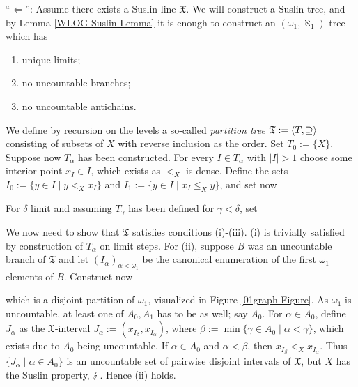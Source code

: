 {``$\Leftarrow$'': Assume there exists a Suslin line $\mathfrak{X}$. We will construct a Suslin tree, and by Lemma \ref{WLOG Suslin Lemma} it is enough to construct an $(\omega_1,\aleph_1)$-tree which has
\begin{enumerate}
\item unique limits;
\item no uncountable branches;
\item no uncountable antichains.\\
\end{enumerate}

We define by recursion on the levels a so-called \textit{partition tree} $\mathfrak{T}:=\langle T,\supseteq\rangle$ consisting of subsets of $X$ with reverse inclusion as the order. Set $T_0:=\{X\}$. Suppose now $T_\alpha$ has been constructed. For every $I\in T_\alpha$ with $|I|>1$ choose some interior point $x_I\in I$, which exists as $<_X$ is dense. Define the sets $I_0:=\{y\in I\mid y<_X x_I\}$ and $I_1:=\{y\in I\mid x_I\leq_X y\}$, and set now

For $\delta$ limit and assuming $T_\gamma$ has been defined for $\gamma<\delta$, set

We now need to show that $\mathfrak{T}$ satisfies conditions (i)-(iii). (i) is trivially satisfied by construction of $T_\alpha$ on limit steps. For (ii), suppose $B$ was an uncountable branch of $\mathfrak{T}$ and let $(I_\alpha)_{\alpha<\omega_1}$ be the canonical enumeration of the first $\omega_1$ elements of $B$. Construct now

which is a disjoint partition of $\omega_1$, visualized in Figure \ref{01graph Figure}. As $\omega_1$ is uncountable, at least one of $A_0,A_1$ has to be as well; say $A_0$. For $\alpha\in A_0$, define $J_\alpha$ as the $\mathfrak{X}$-interval $J_\alpha:=(x_{I_\beta},x_{I_\alpha})$, where $\beta:=\min\{\gamma\in A_0\mid\alpha<\gamma\}$, which exists due to $A_0$ being uncountable. If $\alpha\in A_0$ and $\alpha<\beta$, then $x_{I_\beta}<_X x_{I_\alpha}$. Thus $\{J_\alpha\mid\alpha\in A_0\}$ is an uncountable set of pairwise disjoint intervals of $\mathfrak{X}$, but $X$ has the Suslin property, $\operatorname{\lightning}$. Hence (ii) holds.

}
